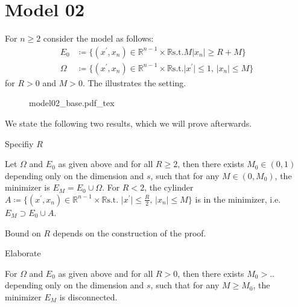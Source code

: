 \section{Model 02}
\label{sec:model02}

For \( n \geq 2 \) consider the model as follows:
\begin{align*}
	E_0    & \coloneqq \{(x^\prime, x_n) \in \mathbb{R}^{n - 1} \times \mathbb{R} \text{s.t.} M \lvert x_n \rvert \geq R + M \} \\
	\Omega & \coloneqq \{(x^\prime, x_n) \in \mathbb{R}^{n - 1} \times \mathbb{R} \text{s.t.} \lvert x^\prime \rvert \leq 1, \, \lvert x_n \rvert \leq M \}
\end{align*}
for \( R > 0 \) and \( M > 0 \). The  illustrates the setting.

\begin{figure}[h]
	\centering
	\def\svgscale{1}
	{model02_base.pdf_tex}
	\caption{}
	\label{fig:104}
\end{figure}

We state the following two results, which we will prove afterwards.

\begin{TODO}
	Specifiy \( R \)
\end{TODO}
\begin{theorem}
	\label{thm:103}
	Let \( \Omega \) and \( E_0 \) as given above and for all \( R \geq 2 \), then there
	exists \( M_0 \in (0, 1) \) depending only on the dimension and \( s \), such that
	for any \( M \in (0, M_0) \), the minimizer is \( E_M = E_0 \cup \Omega \). For \( R
	< 2 \), the cylinder \( A \coloneqq \{(x^\prime, x_n) \in \mathbb{R}^{n - 1} \times
	\mathbb{R} \text{s.t.~} \lvert x^\prime \rvert \leq  \frac{R}{2} , \, \lvert x_n \rvert \leq M
	\} \) is in the minimizer, i.e.\ \( E_M \supset E_0 \cup A \).
\end{theorem}
\begin{note}
	Bound on \( R \) depends on the construction of the proof.
	\begin{TODO}
		Elaborate
	\end{TODO}
\end{note}

\begin{theorem}
	\label{thm:104}
	For \( \Omega \) and \( E_0 \) as given above and for all \( R > 0 \), then there
	exists \( M_0 >.. \) depending only on the dimension and \( s \), such that
	for any \( M \geq M_0 \), the minimizer \( E_M \) is disconnected.
\end{theorem}

